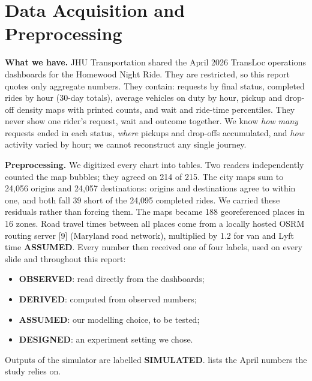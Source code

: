 \documentclass{article}
\newcommand{\lab}[1]{{\footnotesize\textsf{\textbf{#1}}}}
\newcommand{\OBS}{\lab{OBSERVED}}
\newcommand{\DER}{\lab{DERIVED}}
\newcommand{\ASM}{\lab{ASSUMED}}
\newcommand{\DES}{\lab{DESIGNED}}
\newcommand{\SIM}{\lab{SIMULATED}}
\begin{document}
\section{Data Acquisition and Preprocessing}\label{sec:data}

\textbf{What we have.} JHU Transportation shared the April 2026 TransLoc operations dashboards for the Homewood Night Ride. They are restricted, so this report quotes only aggregate numbers. They contain: requests by final status, completed rides by hour (30-day totals), average vehicles on duty by hour, pickup and drop-off density maps with printed counts, and wait and ride-time percentiles. They never show one rider's request, wait and outcome together. We know \emph{how many} requests ended in each status, \emph{where} pickups and drop-offs accumulated, and \emph{how} activity varied by hour; we cannot reconstruct any single journey.

\textbf{Preprocessing.} We digitized every chart into tables. Two readers independently counted the map bubbles; they agreed on 214 of 215. The city maps sum to 24,056 origins and 24,057 destinations: origins and destinations agree to within one, and both fall 39 short of the 24,095 completed rides. We carried these residuals rather than forcing them. The maps became 188 georeferenced places in 16 zones. Road travel times between all places come from a locally hosted OSRM routing server [9] (Maryland road network), multiplied by 1.2 for van and Lyft time \ASM. Every number then received one of four labels, used on every slide and throughout this report:
\begin{itemize}\setlength\itemsep{1pt}
\item \OBS: read directly from the dashboards;
\item \DER: computed from observed numbers;
\item \ASM: our modelling choice, to be tested;
\item \DES: an experiment setting we chose.
\end{itemize}
Outputs of the simulator are labelled \SIM.  lists the April numbers the study relies on.
\end{document}
